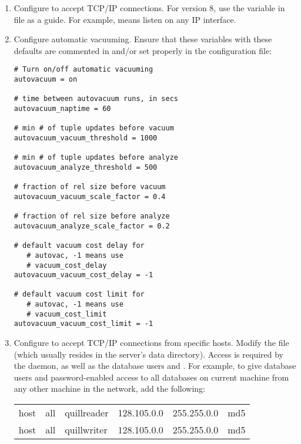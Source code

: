 \begin{enumerate}

\item Configure to accept TCP/IP connections.
For  version 8,
use the  variable in 
 file as a guide.
For example,
means listen on any IP interface.

\item Configure automatic vacuuming.
Ensure that these variables with these defaults are
commented in and/or set properly in the 
 configuration file:
\begin{verbatim}
# Turn on/off automatic vacuuming
autovacuum = on

# time between autovacuum runs, in secs
autovacuum_naptime = 60

# min # of tuple updates before vacuum
autovacuum_vacuum_threshold = 1000

# min # of tuple updates before analyze
autovacuum_analyze_threshold = 500

# fraction of rel size before vacuum
autovacuum_vacuum_scale_factor = 0.4 

# fraction of rel size before analyze
autovacuum_analyze_scale_factor = 0.2

# default vacuum cost delay for 
   # autovac, -1 means use 
   # vacuum_cost_delay
autovacuum_vacuum_cost_delay = -1  

# default vacuum cost limit for 
   # autovac, -1 means use
   # vacuum_cost_limit
autovacuum_vacuum_cost_limit = -1   
\end{verbatim}


\item Configure  to accept TCP/IP connections from 
specific hosts.
Modify the  file 
(which usually resides in the  server's data directory).
Access is required by the  daemon,
as well as the database users
 and .
For example, to give
database users  and 
password-enabled access to all databases on current machine from any
other machine in the network, add the following:

\begin{tabular}{llllll}
host&all&quillreader&128.105.0.0&255.255.0.0&md5\\
host&all&quillwriter&128.105.0.0&255.255.0.0&md5
\end{tabular}


\end{enumerate}

